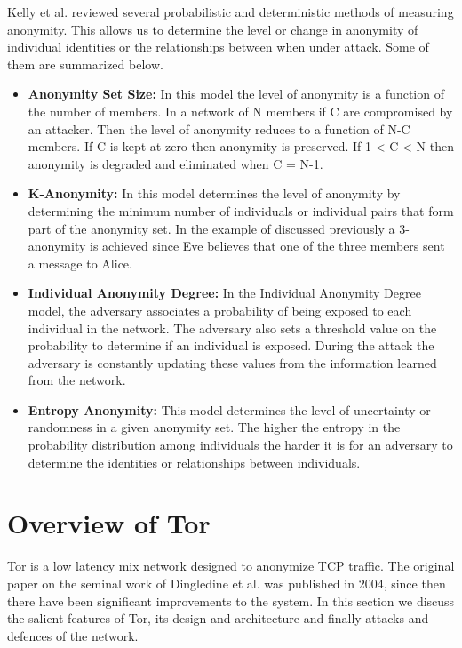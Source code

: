 \documentclass{llncs}
\begin{document}
Kelly et al. \cite{kelly2012exploring} reviewed several probabilistic and deterministic methods of measuring anonymity. This allows us to determine the level or change in anonymity of individual identities or the relationships between when under attack. Some of them are summarized below. 
\begin{itemize}
	\item[]{\textbf{Anonymity Set Size:} In this model the level of anonymity is a function of the number of members. In a network of N members if C are compromised by an attacker. Then the level of anonymity reduces to a function of N-C members. If C is kept at zero then anonymity is preserved. If 1 < C < N then anonymity is degraded and eliminated when C = N-1.}
	\item[]{\textbf{K-Anonymity:} In this model determines the level of anonymity by determining the minimum number of individuals or individual pairs that form part of the anonymity set. In the example of discussed previously a 3-anonymity is achieved since Eve believes that one of the three members sent a message to Alice.}
	\item[]{\textbf{Individual Anonymity Degree:} In the Individual Anonymity Degree model, the adversary associates a probability of being exposed to each individual in the network. The adversary also sets a threshold value on the probability to determine if an individual is exposed. During the attack the adversary is constantly updating these values from the information learned from the network.}
	\item[]{\textbf{Entropy Anonymity:} This model determines the level of uncertainty or randomness in a given anonymity set. The higher the entropy in the probability distribution among individuals the harder it is for an adversary to determine the identities or relationships between individuals.}
\end{itemize}

\section{Overview of Tor} \label{tor}
Tor is a low latency mix network designed to anonymize TCP traffic. The original paper on the seminal work of Dingledine et al. \cite{tor-design} was published in 2004, since then there have been significant improvements to the system. In this section we discuss the salient features of Tor, its design and architecture and finally attacks and defences of the network. 
\end{document}
